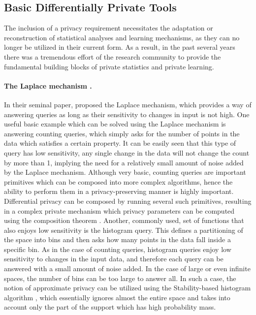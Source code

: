 \documentclass[12pt,a4paper,oneside,onecolumn]{book}
\begin{document}
\subsection{Basic Differentially Private Tools}

%
%
The inclusion of a privacy requirement necessitates the adaptation or reconstruction of statistical analyses and learning mechanisms, as they can no longer be utilized in their current form. 
As a result, in the past several years there was a tremendous effort of the research community to provide the fundamental building blocks of private statistics and private learning. 

\paragraph{The Laplace mechanism \citet{dwork2006calibrating}.}
In their seminal paper, \citeauthor{dwork2006calibrating} proposed the Laplace mechanism, which provides a way of answering queries as long as their sensitivity to changes in input is not high.  
One useful basic example which can be solved using the Laplace mechanism is answering counting queries, which simply asks for the number of points in the data which satisfies a certain property. 
It can be easily seen that this type of query has low sensitivity, any single change in the data will not change the count by more than 1, implying the need for a relatively small amount of noise added by the Laplace mechanism.
%
%
Although very basic, counting queries are important primitives which can be composed into more complex algorithms, hence the ability to perform them in a privacy-preserving manner is highly important. 
Differential privacy can be composed by running several such primitives, resulting in a complex private mechanism which privacy parameters can be computed using the composition theorem \citep{dwork2006calibrating,5670947}. 
Another, commonly used, set of functions that also enjoys low sensitivity is the histogram query. This defines a partitioning of the space into bins and then asks how many points in the data fall inside a specific bin. 
As in the case of counting queries, histogram queries enjoy low sensitivity to changes in the input data, and therefore each query can be answered with a small amount of noise added. In the case of large or even infinite spaces, the number of bins can be too large to answer all. In such a case, the notion of approximate privacy can be utilized using the Stability-based histogram algorithm \citet{JMLR:v20:18-549}, which essentially ignores almost the entire space and takes into account only the part of the support which has high probability mass.
\end{document}
